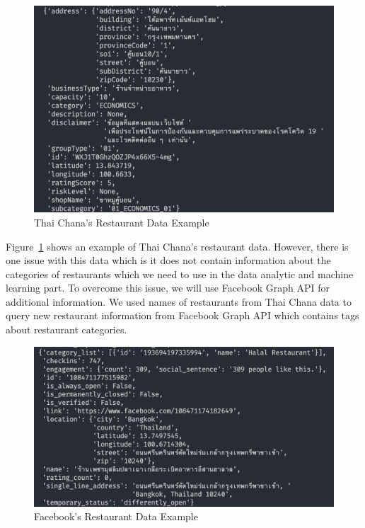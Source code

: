 \documentclass[12pt,oneside,openright,a4paper]{cpe-english-project}
\begin{document}
\begin{figure}[H]\centering
\includegraphics[width=400pt]{./images/4ThaiChanasRestaurantDataExample.png}
\caption{Thai Chana’s Restaurant Data Example}\label{fig:4ThaiChanasRestaurantDataExample}
\end{figure}

Figure~\ref{fig:4ThaiChanasRestaurantDataExample} shows an example of Thai Chana’s restaurant data. However, there is one issue with this data which is it does not contain information about the categories of restaurants which we need to use in the data analytic and machine learning part. To overcome this issue, we will use Facebook Graph API for additional information. We used names of restaurants from Thai Chana data to query new restaurant information from Facebook Graph API which contains tags about restaurant categories.

\newpage
\begin{figure}[H]\centering
\includegraphics[width=400pt]{./images/4FacebooksRestaurantDataExample.png}
\caption{Facebook’s Restaurant Data Example}\label{fig:4FacebooksRestaurantDataExample}
\end{figure}
\end{document}
